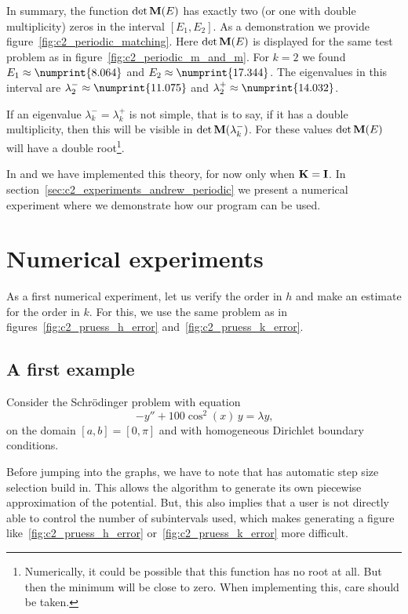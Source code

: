 In summary, the function $\det\vb{M}(E)$ has exactly two (or one with double multiplicity) zeros in the interval $[E_1, E_2]$. As a demonstration we provide figure~\ref{fig:c2_periodic_matching}. Here $\det\vb{M}(E)$ is displayed for the same test problem as in figure~\ref{fig:c2_periodic_m_and_m}. For $k = 2$ we found $E_1 \approx \numprint{8.064}$ and $E_2 \approx \numprint{17.344}$. The eigenvalues in this interval are $\lambda_2^{-} \approx \numprint{11.075}$ and $\lambda_2^{+} \approx \numprint{14.032}$.

If an eigenvalue $\lambda^{-}_k = \lambda^{+}_k$ is not simple, that is to say, if it has a double multiplicity, then this will be visible in $\det\vb{M}(\lambda^{-}_k)$. For these values $\det\vb{M}(E)$ will have a double root\footnote{Numerically, it could be possible that this function has no root at all. But then the minimum will be close to zero. When implementing this, care should be taken.}.

In  and \pyslise{} we have implemented this theory, for now only when $\vb{K} = \vb{I}$. In section~\ref{sec:c2_experiments_andrew_periodic} we present a numerical experiment where we demonstrate how our program can be used.


\section{Numerical experiments}\label{sec:c2_numerical_experiments}

As a first numerical experiment, let us verify the order in $h$ and make an estimate for the order in $k$. For this, we use the same problem as in figures~\ref{fig:c2_pruess_h_error} and~\ref{fig:c2_pruess_k_error}.

\subsection{A first example}

Consider the Schrödinger problem with equation
\begin{equation}\label{equ:c2_matslise_order_test_problem}
    -y'' + 100\cos^2(x)\,y = \lambda y\text{,}
\end{equation}
on the domain $[a, b] = [0, \pi]$ and with homogeneous Dirichlet boundary conditions.

Before jumping into the graphs, we have to note that  has automatic step size selection build in. This allows the algorithm to generate its own piecewise approximation of the potential. But, this also implies that a user is not directly able to control the number of subintervals used, which makes generating a figure like~\ref{fig:c2_pruess_h_error} or~\ref{fig:c2_pruess_k_error} more difficult.

